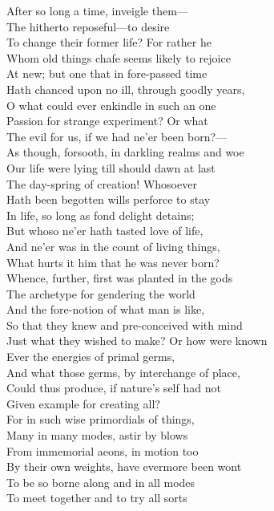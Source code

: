 After so long a time, inveigle them—\\
The hitherto reposeful—to desire\\
To change their former life? For rather he\\
Whom old things chafe seems likely to rejoice\\
At new; but one that in fore-passed time\\
Hath chanced upon no ill, through goodly years,\\
O what could ever enkindle in such an one\\
Passion for strange experiment? Or what\\
The evil for us, if we had ne'er been born?—\\
As though, forsooth, in darkling realms and woe\\
Our life were lying till should dawn at last\\
The day-spring of creation! Whosoever\\
Hath been begotten wills perforce to stay\\
In life, so long as fond delight detains;\\
But whoso ne'er hath tasted love of life,\\
And ne'er was in the count of living things,\\
What hurts it him that he was never born?\\
Whence, further, first was planted in the gods\\
The archetype for gendering the world\\
And the fore-notion of what man is like,\\
So that they knew and pre-conceived with mind\\
Just what they wished to make? Or how were known\\
Ever the energies of primal germs,\\
And what those germs, by interchange of place,\\
Could thus produce, if nature's self had not\\
Given example for creating all?\\
For in such wise primordials of things,\\
Many in many modes, astir by blows\\
From immemorial aeons, in motion too\\
By their own weights, have evermore been wont\\
To be so borne along and in all modes\\
To meet together and to try all sorts\\
